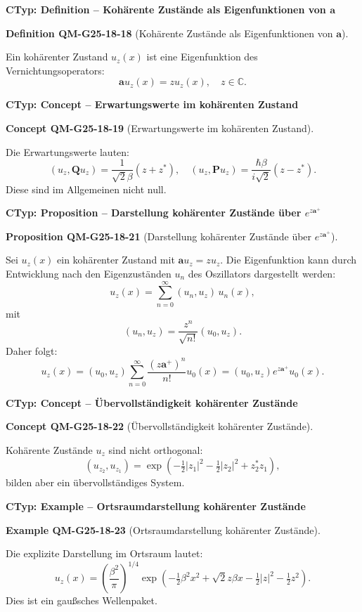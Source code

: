 \documentclass[10pt, letterpaper]{article}
\newcommand{\CustomHeading}[3]{%
  \par\medskip\noindent%
  \textbf{#1 #2} \textnormal{(#3)}.\enskip%
}
\newenvironment{DEF}[2]{\begin{unitbox}\CustomHeading{Definition}{#1}{#2}}{\end{unitbox}}
\newenvironment{PROP}[2]{\begin{unitbox}\CustomHeading{Proposition}{#1}{#2}}{\end{unitbox}}
\newenvironment{EXA}[2]{\begin{unitbox}\CustomHeading{Example}{#1}{#2}}{\end{unitbox}}
\newenvironment{CONC}[2]{\begin{unitbox}\CustomHeading{Concept}{#1}{#2}}{\end{unitbox}}
\begin{document}
\textbf{CTyp: Definition – Kohärente Zustände als Eigenfunktionen von $\mathbf{a}$}

\begin{DEF}{QM-G25-18-18}{Kohärente Zustände als Eigenfunktionen von $\mathbf{a}$}
Ein kohärenter Zustand $u_z(x)$ ist eine Eigenfunktion des Vernichtungsoperators:
\[
\mathbf{a} u_z(x) = z u_z(x), \quad z \in \mathbb{C}.
\]
\end{DEF}


\textbf{CTyp: Concept – Erwartungswerte im kohärenten Zustand}

\begin{CONC}{QM-G25-18-19}{Erwartungswerte im kohärenten Zustand}
Die Erwartungswerte lauten:
\[
\left(u_z, \mathbf{Q} u_z\right) = \frac{1}{\sqrt{2} \beta} (z + z^*), \quad
\left(u_z, \mathbf{P} u_z\right) = \frac{\hbar \beta}{i \sqrt{2}} (z - z^*).
\]
Diese sind im Allgemeinen nicht null.
\end{CONC}


\textbf{CTyp: Proposition – Darstellung kohärenter Zustände über $e^{z\mathbf{a}^+}$}

\begin{PROP}{QM-G25-18-21}{Darstellung kohärenter Zustände über $e^{z\mathbf{a}^+}$}
Sei $u_z(x)$ ein kohärenter Zustand mit $\mathbf{a} u_z = z u_z$. Die Eigenfunktion kann durch Entwicklung nach den Eigenzuständen $u_n$ des Oszillators dargestellt werden:
\[
u_z(x) = \sum_{n=0}^\infty (u_n, u_z) \, u_n(x),
\]
mit
\[
(u_n, u_z) = \frac{z^n}{\sqrt{n!}} (u_0, u_z).
\]
Daher folgt:
\[
u_z(x) = (u_0, u_z) \sum_{n=0}^\infty \frac{(z \mathbf{a}^+)^n}{n!} u_0(x) = (u_0, u_z) e^{z \mathbf{a}^+} u_0(x).
\]
\end{PROP}



\textbf{CTyp: Concept – Übervollständigkeit kohärenter Zustände}

\begin{CONC}{QM-G25-18-22}{Übervollständigkeit kohärenter Zustände}
Kohärente Zustände $u_z$ sind nicht orthogonal:
\[
(u_{z_2}, u_{z_1}) = \exp\left(-\tfrac{1}{2}|z_1|^2 - \tfrac{1}{2}|z_2|^2 + z_2^* z_1\right),
\]
bilden aber ein übervollständiges System.
\end{CONC}


\textbf{CTyp: Example – Ortsraumdarstellung kohärenter Zustände}

\begin{EXA}{QM-G25-18-23}{Ortsraumdarstellung kohärenter Zustände}
Die explizite Darstellung im Ortsraum lautet:
\[
u_z(x) = \left( \frac{\beta^2}{\pi} \right)^{1/4} \exp\left( -\tfrac{1}{2} \beta^2 x^2 + \sqrt{2} z \beta x - \tfrac{1}{2}|z|^2 - \tfrac{1}{2}z^2 \right).
\]
Dies ist ein gaußsches Wellenpaket.
\end{EXA}
\end{document}
